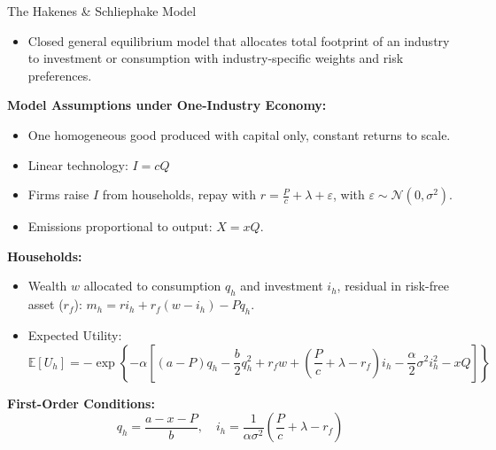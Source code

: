 \documentclass{beamer}
\begin{document}
\begin{frame}{The Hakenes \& Schliephake Model}
\footnotesize
\vspace{-2.5em}
\begin{itemize}
\item Closed general equilibrium model that allocates total footprint of an industry to investment or consumption with industry-specific weights and risk preferences.

\end{itemize}

\vspace{0.4em}
\textbf{Model Assumptions under One-Industry Economy:}
\begin{itemize}
  \item One homogeneous good produced with capital only, constant returns to scale.
  \item Linear technology: \( I = c Q \)
  \item Firms raise \(I\) from households, repay with \(r = \frac{P}{c} + \lambda + \varepsilon\), with \(\varepsilon \sim \mathcal{N}(0,\sigma^2)\).
  \item Emissions proportional to output: \( X = x Q \).
\end{itemize}

\textbf{Households:}
\begin{itemize}
  \item Wealth \(w\) allocated to consumption \(q_h\) and investment \(i_h\), residual in risk-free asset (\(r_f\)): $m_h = r i_h + r_f(w - i_h) - P q_h $.
  
  \item Expected Utility:  
  \[
  \mathbb{E}[U_h] = -\exp\left\{ -\alpha \left[ (a - P)q_h - \frac{b}{2}q_h^2 + r_f w + \left( \frac{P}{c} + \lambda - r_f \right)i_h - \frac{\alpha}{2}\sigma^2 i_h^2 - xQ \right] \right\} 
  \]
\end{itemize}

\textbf{First-Order Conditions:}
\[
q_h = \frac{a - x - P}{b}, \quad 
i_h = \frac{1}{\alpha\sigma^2}\left(\frac{P}{c} + \lambda - r_f\right)
\]
\end{frame}
\end{document}
